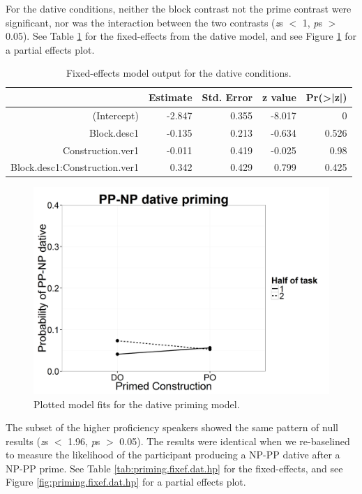 For the dative conditions, neither the block contrast not the prime contrast were significant, nor was the interaction between the two contrasts (\emph{z}s $<$ 1, \emph{p}s $>$ 0.05). See Table \ref{tab:priming.fixef.dat} for the fixed-effects from the dative model, and see Figure \ref{fig:priming.fixef.dat} for a partial effects plot.

\begin{table}[htbp]
  \centering
  \caption{Fixed-effects model output for the dative conditions.}
    \begin{tabular}{rrrrr}
    \toprule
          & Estimate & Std. Error & z value & Pr(>|z|) \\
    \midrule
    (Intercept) & -2.847 & 0.355 & -8.017 & 0 \\
    Block.desc1 & -0.135 & 0.213 & -0.634 & 0.526 \\
    Construction.ver1 & -0.011 & 0.419 & -0.025 & 0.98 \\
    Block.desc1:Construction.ver1 & 0.342 & 0.429 & 0.799 & 0.425 \\
    \bottomrule
    \end{tabular}%
  \label{tab:priming.fixef.dat}%
\end{table}%

\begin{figure}[htbp]
\centering
\includegraphics[width=\textwidth,height=\textheight,keepaspectratio]{dat.png}
\caption{Plotted model fits for the dative priming model. }
\label{fig:priming.fixef.dat}
\end{figure}


The subset of the higher proficiency speakers showed the same pattern of null results (\emph{z}s $<$ 1.96, \emph{p}s $>$ 0.05). The results were identical when we re-baselined to measure the likelihood of the participant producing a NP-PP dative after a NP-PP prime. See Table \ref{tab:priming.fixef.dat.hp} for the fixed-effects, and see Figure \ref{fig:priming.fixef.dat.hp} for a partial effects plot.

